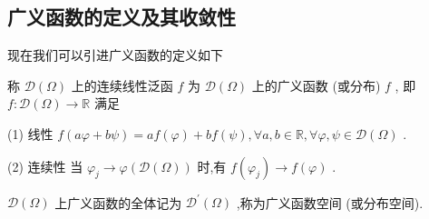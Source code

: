 \documentclass[lang=cn,newtx,10pt,scheme=chinese,thmcnt=chapter]{elegantbook}
\begin{document}
\subsection{广义函数的定义及其收敛性}

现在我们可以引进广义函数的定义如下
\begin{definition}
  称 \(\mathcal{D}\left( \Omega \right)\) 上的连续线性泛函 \(f\) 为 \(\mathcal{D}\left( \Omega \right)\) 上的广义函数 (或分布) \(f\) , 即 \(f : \mathcal{D}\left( \Omega \right)  \rightarrow  \mathbb{R}\) 满足

(1) 线性 \(f\left( {{a\varphi } + {b\psi }}\right)  = {af}\left( \varphi \right)  + {bf}\left( \psi \right) ,\forall a,b \in  \mathbb{R},\forall \varphi ,\psi  \in  \mathcal{D}\left( \Omega \right)\) .

(2) 连续性 当 \({\varphi }_{j} \rightarrow  \varphi \left( {\mathcal{D}\left( \Omega \right) }\right)\) 时,有 \(f\left( {\varphi }_{j}\right)  \rightarrow  f\left( \varphi \right)\) .

\(\mathcal{D}\left( \Omega \right)\) 上广义函数的全体记为 \({\mathcal{D}}^{\prime }\left( \Omega \right)\) ,称为广义函数空间 (或分布空间).
\end{definition}
\end{document}
